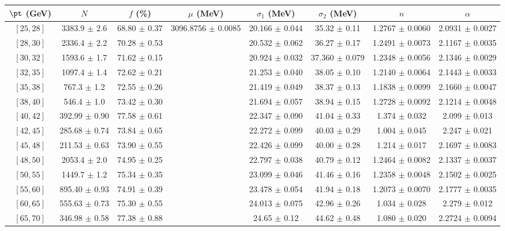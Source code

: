 \begin{tabular}{c||c|c|c|c|c|c|c}
$\pt$ (GeV) & $N$ & $f$ (\%) & $\mu$ (MeV) & $\sigma_1$ (MeV) & $\sigma_2$ (MeV) & $n$ & $\alpha$ \\
\hline
$[25, 28]$ & 3383.9 $\pm$ 2.6 & 68.80 $\pm$ 0.37 & \multirow{19}{*}{3096.8756 $\pm$ 0.0085} & 20.166 $\pm$ 0.044 & 35.32 $\pm$ 0.11 & 1.2767 $\pm$ 0.0060 & 2.0931 $\pm$ 0.0027\\
$[28, 30]$ & 2336.4 $\pm$ 2.2 & 70.28 $\pm$ 0.53 &  & 20.532 $\pm$ 0.062 & 36.27 $\pm$ 0.17 & 1.2491 $\pm$ 0.0073 & 2.1167 $\pm$ 0.0035\\
$[30, 32]$ & 1593.6 $\pm$ 1.7 & 71.62 $\pm$ 0.15 &  & 20.924 $\pm$ 0.032 & 37.360 $\pm$ 0.079 & 1.2348 $\pm$ 0.0056 & 2.1346 $\pm$ 0.0029\\
$[32, 35]$ & 1097.4 $\pm$ 1.4 & 72.62 $\pm$ 0.21 &  & 21.253 $\pm$ 0.040 & 38.05 $\pm$ 0.10 & 1.2140 $\pm$ 0.0064 & 2.1443 $\pm$ 0.0033\\
$[35, 38]$ & 767.3 $\pm$ 1.2 & 72.55 $\pm$ 0.26 &  & 21.419 $\pm$ 0.049 & 38.37 $\pm$ 0.13 & 1.1838 $\pm$ 0.0099 & 2.1660 $\pm$ 0.0047\\
$[38, 40]$ & 546.4 $\pm$ 1.0 & 73.42 $\pm$ 0.30 &  & 21.694 $\pm$ 0.057 & 38.94 $\pm$ 0.15 & 1.2728 $\pm$ 0.0092 & 2.1214 $\pm$ 0.0048\\
$[40, 42]$ & 392.99 $\pm$ 0.90 & 77.58 $\pm$ 0.61 &  & 22.347 $\pm$ 0.090 & 41.04 $\pm$ 0.33 & 1.374 $\pm$ 0.032 & 2.099 $\pm$ 0.013\\
$[42, 45]$ & 285.68 $\pm$ 0.74 & 73.84 $\pm$ 0.65 &  & 22.272 $\pm$ 0.099 & 40.03 $\pm$ 0.29 & 1.004 $\pm$ 0.045 & 2.247 $\pm$ 0.021\\
$[45, 48]$ & 211.53 $\pm$ 0.63 & 73.90 $\pm$ 0.55 &  & 22.426 $\pm$ 0.099 & 40.00 $\pm$ 0.28 & 1.214 $\pm$ 0.017 & 2.1697 $\pm$ 0.0083\\
$[48, 50]$ & 2053.4 $\pm$ 2.0 & 74.95 $\pm$ 0.25 &  & 22.797 $\pm$ 0.038 & 40.79 $\pm$ 0.12 & 1.2464 $\pm$ 0.0082 & 2.1337 $\pm$ 0.0037\\
$[50, 55]$ & 1449.7 $\pm$ 1.2 & 75.34 $\pm$ 0.35 &  & 23.099 $\pm$ 0.046 & 41.46 $\pm$ 0.16 & 1.2358 $\pm$ 0.0048 & 2.1502 $\pm$ 0.0025\\
$[55, 60]$ & 895.40 $\pm$ 0.93 & 74.91 $\pm$ 0.39 &  & 23.478 $\pm$ 0.054 & 41.94 $\pm$ 0.18 & 1.2073 $\pm$ 0.0070 & 2.1777 $\pm$ 0.0035\\
$[60, 65]$ & 555.63 $\pm$ 0.73 & 75.30 $\pm$ 0.55 &  & 24.013 $\pm$ 0.075 & 42.96 $\pm$ 0.26 & 1.034 $\pm$ 0.028 & 2.279 $\pm$ 0.012\\
$[65, 70]$ & 346.98 $\pm$ 0.58 & 77.38 $\pm$ 0.88 &  & 24.65 $\pm$ 0.12 & 44.62 $\pm$ 0.48 & 1.080 $\pm$ 0.020 & 2.2724 $\pm$ 0.0094\\

\end{tabular}
